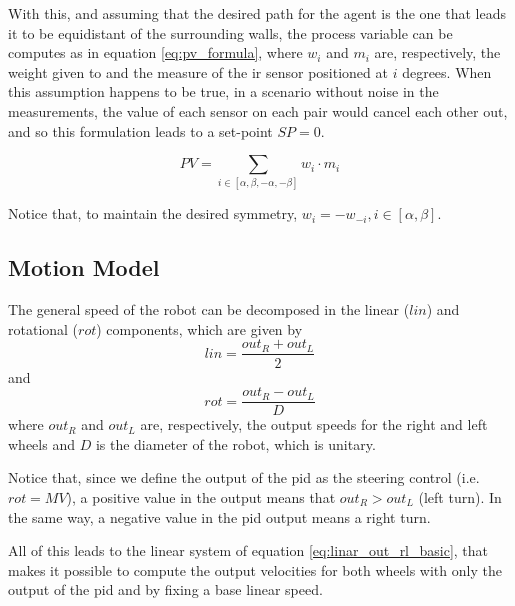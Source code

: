\documentclass[runningheads]{llncs}
\begin{document}
With this, and assuming that the desired path for the agent is the one that leads it to be equidistant of the surrounding walls, the process variable can be computes as in equation \ref{eq:pv_formula}, where $w_i$ and $m_i$ are, respectively, the weight given to and the measure of the \gls{ir} sensor positioned at $i$ degrees. When this assumption happens to be true, in a scenario without noise in the measurements, the value of each sensor on each pair would cancel each other out, and so this formulation leads to a set-point $SP = 0$.

\begin{equation}
    PV = \sum_{i \in [\alpha, \beta, -\alpha, -\beta]} w_i \cdot m_i
    \label{eq:pv_formula}
\end{equation}
% 

Notice that, to maintain the desired symmetry, $w_i = -w_{-i}, i \in [\alpha, \beta]$.

\subsection{Motion Model}
\label{subsec:motion_model}

The general speed of the robot can be decomposed in the linear ($lin$) and rotational ($rot$) components, which are given by
%
\begin{equation}
    lin = \frac{out_R + out_L}{2}
\end{equation}
%
and
%
\begin{equation}
    rot = \frac{out_R - out_L}{D}
\end{equation}
%
where $out_R$ and $out_L$ are, respectively, the output speeds for the right and left wheels and $D$ is the diameter of the robot, which is unitary.

Notice that, since we define the output of the \gls{pid} as the steering control (i.e. $rot=MV$), a positive value in the output means that $out_R > out_L$ (left turn). In the same way, a negative value in the \gls{pid} output means a right turn.

All of this leads to the linear system of equation \ref{eq:linar_out_rl_basic}, that makes it possible to compute the output velocities for both wheels with only the output of the \gls{pid} and by fixing a base linear speed.
\end{document}
